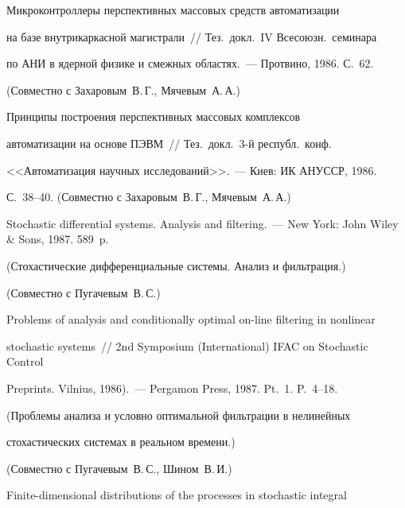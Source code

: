  Микроконтроллеры перспективных массовых средств автоматизации


на базе внутрикаркасной магистрали~// Тез.\ докл.\ IV Всесоюзн.\ семинара


по АНИ в ядерной физике и смежных областях.~--- Протвино, 1986. С.~62.


(Совместно с Захаровым~В.\,Г., Мячевым~А.\,А.)





 Принципы построения перспективных массовых комплексов


автоматизации на основе ПЭВМ~// Тез.\ докл.\ 3-й республ.\ конф.\


<<Автоматизация научных исследований>>.~--- Киев: ИК АН\linebreak УССР, 1986.


С.~38--40. (Совместно с Захаровым~В.\,Г., Мячевым~А.\,А.)


\vspace*{-4.5pt}







\vspace*{-1.5pt}





Stochastic differential systems. Analysis and filtering.~--- New York: John Wiley \& Sons, 1987. 589~p.


(Стохастические дифференциальные системы. Анализ и фильтрация.)


(Совместно с Пугачевым~В.\,С.)





Problems of analysis and conditionally optimal on-line filtering in nonlinear 


stochastic systems~// 2nd Symposium (International) IFAC on Stochastic Control 


Preprints. Vilnius, 1986).~--- Pergamon Press, 1987. Pt.~1. P.~4--18.


(Проблемы анализа и условно оптимальной фильтрации в нелинейных


стохастических сис\-те\-мах в реальном времени.)


 (Совместно с Пугачевым~В.\,С., Шином~В.\,И.)





 Finite-dimensional distributions of the processes in stochastic integral 



